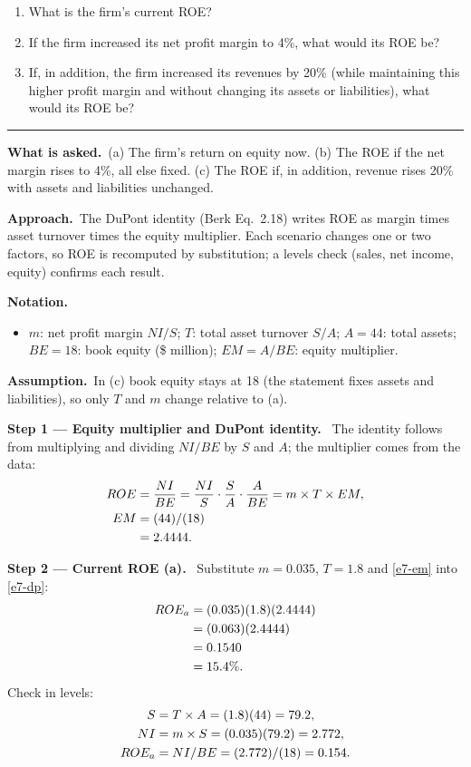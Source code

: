 \documentclass[11pt,a4paper]{article}
\newcommand{\notation}{\par\noindent\textbf{Notation.}}
\newcommand{\step}[2]{\par\medskip\noindent\textbf{Step #1 --- #2.}~}
\newcommand{\assume}{\par\smallskip\noindent\textbf{Assumption.}~}
\newcommand{\asked}{\par\medskip\noindent\textbf{What is asked.}~}
\newcommand{\approach}{\par\smallskip\noindent\textbf{Approach.}~}
\newcommand{\stmtend}{\par\endgroup\nopagebreak\noindent\rule{\linewidth}{0.4pt}\par\medskip}
\begin{document}
\begin{enumerate}
\def\labelenumi{\alph{enumi}.}
\item
  What is the firm's current ROE?
\item
  If the firm increased its net profit margin to 4\%, what would its ROE be?
\item
  If, in addition, the firm increased its revenues by 20\% (while maintaining this higher profit
  margin and without changing its assets or liabilities), what would its ROE be?
\end{enumerate}
\stmtend

\asked (a) The firm's return on equity now. (b) The ROE if the net margin rises to 4\%, all else
fixed. (c) The ROE if, in addition, revenue rises 20\% with assets and liabilities unchanged.

\approach The DuPont identity (Berk Eq.~2.18) writes ROE as margin times asset turnover times the
equity multiplier. Each scenario changes one or two factors, so ROE is recomputed by substitution;
a levels check (sales, net income, equity) confirms each result.

\notation
\begin{itemize}
  \item $m$: net profit margin $NI/S$; $T$: total asset turnover $S/A$; $A = 44$: total assets;
        $BE = 18$: book equity (\$ million); $EM = A/BE$: equity multiplier.
\end{itemize}
\assume In (c) book equity stays at 18 (the statement fixes assets and liabilities), so only $T$
and $m$ change relative to (a).

\step{1}{Equity multiplier and DuPont identity}
The identity follows from multiplying and dividing $NI/BE$ by $S$ and $A$; the multiplier comes from
the data:
\begin{align}
  ROE &= \frac{NI}{BE} = \frac{NI}{S}\cdot\frac{S}{A}\cdot\frac{A}{BE} = m \times T \times EM, \label{e7-dp}\\
  EM &= (44)/(18) \notag\\
  &= 2.4444. \label{e7-em}
\end{align}

\step{2}{Current ROE (a)}
Substitute $m = 0.035$, $T = 1.8$ and \eqref{e7-em} into \eqref{e7-dp}:
\begin{align}
  ROE_a &= (0.035)(1.8)(2.4444) \notag\\
  &= (0.063)(2.4444) \notag\\
  &= 0.1540 \notag\\
 &= 15.4\%. \notag
\end{align}
Check in levels:
\begin{align}
  S &= T \times A = (1.8)(44) = 79.2, \notag\\
  NI &= m \times S = (0.035)(79.2) = 2.772, \notag\\
  ROE_a &= NI/BE = (2.772)/(18) = 0.154. \notag
\end{align}
\end{document}
